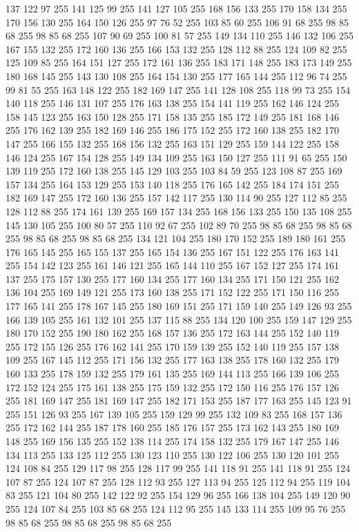 137 122 97 255 141 125 99 255 141 127 105 255 168 156 133 255 170 158 134 255 170 156 130 255 164 150 126 255 97 76 52 255 103 85 60 255 106 91 68 255 98 85 68 255 98 85 68 255 107 90 69 255 100 81 57 255 149 134 110 255 146 132 106 255 167 155 132 255 172 160 136 255 166 153 132 255 128 112 88 255 124 109 82 255 125 109 85 255 164 151 127 255 172 161 136 255 183 171 148 255 183 173 149 255 180 168 145 255 143 130 108 255 164 154 130 255 177 165 144 255 112 96 74 255 99 81 55 255 163 148 122 255 182 169 147 255 141 128 108 255 118 99 73 255 154 140 118 255 146 131 107 255 176 163 138 255 154 141 119 255 162 146 124 255 158 145 123 255 163 150 128 255 171 158 135 255 185 172 149 255 181 168 146 255 176 162 139 255 182 169 146 255 186 175 152 255 172 160 138 255 182 170 147 255 166 155 132 255 168 156 132 255 163 151 129 255 159 144 122 255 158 146 124 255 167 154 128 255 149 134 109 255 163 150 127 255 111 91 65 255 150 139 119 255 172 160 138 255 145 129 103 255 103 84 59 255
123 108 87 255 169 157 134 255 164 153 129 255 153 140 118 255 176 165 142 255 184 174 151 255 182 169 147 255 172 160 136 255 157 142 117 255 130 114 90 255 127 112 85 255 128 112 88 255 174 161 139 255 169 157 134 255 168 156 133 255 150 135 108 255 145 130 105 255 100 80 57 255 110 92 67 255 102 89 70 255 98 85 68 255 98 85 68 255 98 85 68 255 98 85 68 255 134 121 104 255 180 170 152 255 189 180 161 255 176 165 145 255 165 155 137 255 165 154 136 255 167 151 122 255 176 163 141 255 154 142 123 255 161 146 121 255 165 144 110 255 167 152 127 255 174 161 137 255 175 157 130 255 177 160 134 255 177 160 134 255 171 150 121 255 162 136 104 255 169 149 121 255 173 160 138 255 171 152 122 255 171 150 116 255 177 165 141 255 178 167 145 255 180 169 151 255 171 159 140 255 149 126 93 255 166 139 105 255 161 132 101 255 137 115 88 255 134 120 100 255 159 147 129 255 180 170 152 255 190 180 162 255 168 157 136 255 172 163 144 255 152 140 119 255 172 155 126 255 176 162 141 255 170 159 139 255
152 140 119 255 157 138 109 255 167 145 112 255 171 156 132 255 177 163 138 255 178 160 132 255 179 160 133 255 178 159 132 255 179 161 135 255 169 144 113 255 166 139 106 255 172 152 124 255 175 161 138 255 175 159 132 255 172 150 116 255 176 157 126 255 181 169 147 255 181 169 147 255 182 171 153 255 187 177 163 255 145 123 91 255 151 126 93 255 167 139 105 255 159 129 99 255 132 109 83 255 168 157 136 255 172 162 144 255 187 178 160 255 185 176 157 255 173 162 143 255 180 169 148 255 169 156 135 255 152 138 114 255 174 158 132 255 179 167 147 255 146 134 113 255 133 125 112 255 130 123 110 255 130 122 106 255 130 120 101 255 124 108 84 255 129 117 98 255 128 117 99 255 141 118 91 255 141 118 91 255 124 107 87 255 124 107 87 255 128 112 93 255 127 113 94 255 125 112 94 255 119 104 83 255 121 104 80 255 142 122 92 255 154 129 96 255 166 138 104 255 149 120 90 255 124 107 84 255 103 85 68 255 124 112 95 255 145 133 114 255 109 95 76 255 98 85 68 255 98 85 68 255 98 85 68 255
